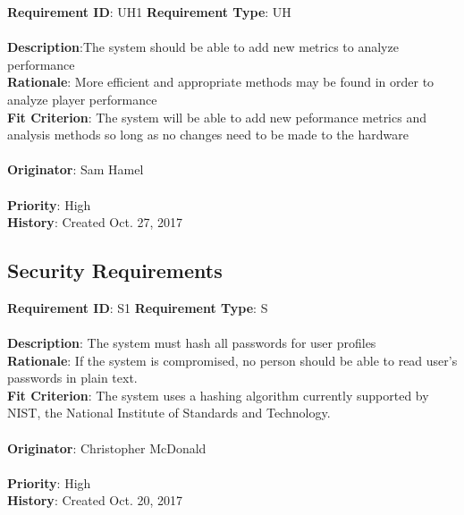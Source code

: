 \documentclass[11pt]{article}
\begin{document}
\begin{framed}
	\noindent\textbf{Requirement ID}: UH1 \hfill \textbf{Requirement Type}: UH \hfill\\\\
	\noindent\textbf{Description}:The system should be able to add new metrics to analyze performance\\
	\textbf{Rationale}: More efficient and appropriate methods may be found in order to analyze player performance\\
	\textbf{Fit Criterion}: The system will be able to add new peformance metrics and analysis methods so long as no changes need to be made to the hardware\\\\
	\textbf{Originator}: Sam Hamel \\\\
	\textbf{Priority}: High \hfill \\
	\noindent\textbf{History}: Created Oct. 27, 2017
\end{framed}


\subsection{Security Requirements}
\begin{framed}
	\noindent\textbf{Requirement ID}: S1 \hfill \textbf{Requirement Type}: S \hfill\\\\
	\noindent\textbf{Description}: The system must hash all passwords for user profiles \\
	\textbf{Rationale}: If the system is compromised, no person should be able to read user's passwords in plain text. \\
	\textbf{Fit Criterion}: The system uses a hashing algorithm currently supported by NIST, the National Institute of Standards and Technology.\\\\
	\textbf{Originator}: Christopher McDonald \\\\
	\textbf{Priority}: High \hfill \\
	\noindent\textbf{History}: Created Oct. 20, 2017
\end{framed}
\end{document}
